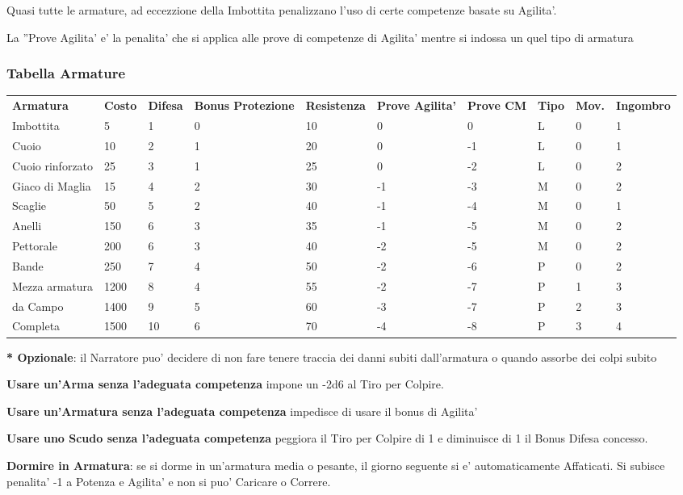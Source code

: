 \documentclass[a4paper,11pt,twoside,openany]{book}
\begin{document}
{		Quasi tutte le armature, ad eccezzione della Imbottita penalizzano l'uso di certe competenze basate su Agilita'. 
		
		La ''Prove Agilita' e' la penalita' che si applica alle prove di competenze di Agilita' mentre si indossa un quel tipo di armatura 
		
		\subsubsection{Tabella Armature}
		\medskip
		
		\label{tabella-armature}
		\begin{tabular}{L{2cm} L{1.2cm} L{1.3cm} L{2cm} L{1.3cm} L{1.5cm} L{1.5cm}L{1cm}L{1cm}L{2cm}} 
			\toprule
			\textbf{Armatura} &\textbf{Costo} & \textbf{Difesa} & \textbf{Bonus Protezione }& \textbf{Resistenza} & \textbf{Prove Agilita’} & \textbf{Prove CM} & \textbf{Tipo} & \textbf{Mov.} & \textbf{Ingombro}\tabularnewline
			Imbottita & 5 & 1 & 0 & 10 & 0 & 0 & L & 0 & 1\tabularnewline
			Cuoio & 10 & 2 & 1 & 20 & 0 & -1 & L & 0 & 1\tabularnewline
			Cuoio rinforzato & 25 & 3 & 1 & 25 & 0 & -2 & L & 0 & 2\tabularnewline
			Giaco di Maglia & 15 & 4 & 2 & 30 & -1 & -3 & M & 0 & 2\tabularnewline
			Scaglie & 50 & 5 & 2 & 40 & -1 & -4 & M & 0 & 1\tabularnewline
			Anelli & 150 & 6 & 3 & 35 & -1 & -5 & M & 0 & 2\tabularnewline
			Pettorale & 200 & 6 & 3 & 40 & -2 & -5 & M & 0 & 2\tabularnewline
			Bande & 250 & 7 & 4 & 50 & -2 & -6 & P & 0 & 2\tabularnewline
			Mezza armatura & 1200 & 8 & 4 & 55 & -2 & -7 & P & 1 & 3\tabularnewline
			da Campo & 1400 & 9 & 5 & 60 & -3 & -7 & P & 2 & 3\tabularnewline
			Completa & 1500 & 10 & 6 & 70 & -4 & -8 & P & 3 & 4\tabularnewline
		\end{tabular}
		
		\textbf{{*} Opzionale}: il Narratore puo' decidere di non fare tenere traccia dei danni subiti dall'armatura o quando assorbe dei colpi subito
		
		\bigskip
		
		\textbf{Usare un'Arma senza l'adeguata competenza} impone un -2d6 al Tiro per Colpire.
		
		\textbf{Usare un'Armatura senza l'adeguata competenza} impedisce di usare il bonus di Agilita'
		
		\textbf{Usare uno Scudo senza l'adeguata competenza} peggiora il Tiro per Colpire di 1 e diminuisce di 1 il Bonus Difesa concesso.
		
		\textbf{Dormire in Armatura}: se si dorme in un'armatura media o pesante, il giorno seguente si e' automaticamente Affaticati. Si subisce penalita' -1 a Potenza e Agilita' e non si puo' Caricare o Correre.
		
}
\end{document}
